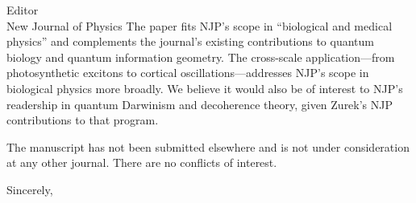 \documentclass[12pt,a4paper]{letter}
\begin{document}
\begin{letter}{Editor\\New Journal of Physics}
The paper fits NJP's scope in ``biological and medical physics'' and complements the journal's existing contributions to quantum biology and quantum information geometry. The cross-scale application---from photosynthetic excitons to cortical oscillations---addresses NJP's scope in biological physics more broadly. We believe it would also be of interest to NJP's readership in quantum Darwinism and decoherence theory, given Zurek's NJP contributions to that program.

The manuscript has not been submitted elsewhere and is not under consideration at any other journal. There are no conflicts of interest.

\closing{Sincerely,}

\end{letter}
\end{document}
